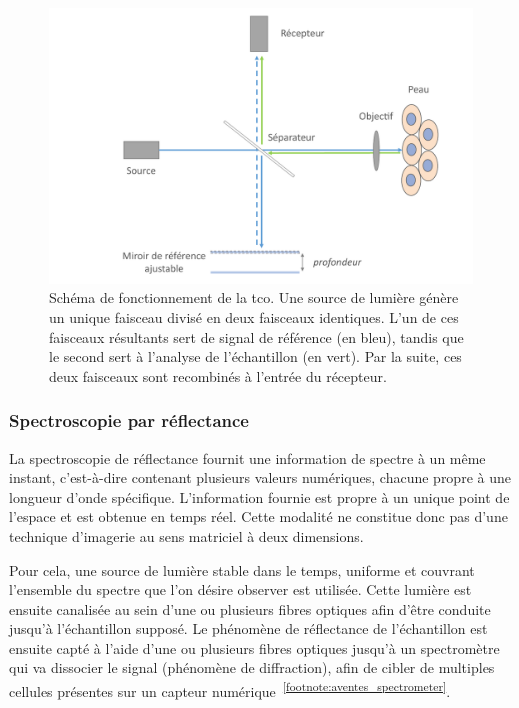 \begin{figure}[H]
    \centering
    \includegraphics[width=1\linewidth]{contents/chapter_2/resources/scheme_principle_oct.pdf}
    \caption{Schéma de fonctionnement de la \gls{tco}. Une source de lumière génère un unique faisceau divisé en deux faisceaux identiques. L'un de ces faisceaux résultants sert de signal de référence (en bleu), tandis que le second sert à l'analyse de l'échantillon (en vert). Par la suite, ces deux faisceaux sont recombinés à l'entrée du récepteur.}
    \label{fig:scheme_principle_oct}
\end{figure}\par
\clearpage

\subsubsection{Spectroscopie par réflectance}
La spectroscopie de réflectance fournit une information de spectre à un même instant, c’est-à-dire contenant plusieurs valeurs numériques, chacune propre à une longueur d'onde spécifique. L'information fournie est propre à un unique point de l'espace et est obtenue en temps réel. Cette modalité ne constitue donc pas d'une technique d'imagerie au sens matriciel à deux dimensions.\par

Pour cela, une source de lumière stable dans le temps, uniforme et couvrant l'ensemble du spectre que l'on désire observer est utilisée. Cette lumière est ensuite canalisée au sein d'une ou plusieurs fibres optiques afin d'être conduite jusqu'à l'échantillon supposé. Le phénomène de réflectance de l'échantillon est ensuite capté à l'aide d'une ou plusieurs fibres optiques jusqu'à un spectromètre qui va dissocier le signal (phénomène de diffraction), afin de cibler de multiples cellules présentes sur un capteur numérique~\cite{Murphy2005,Malla2008}\textsuperscript{\ref{footnote:aventes_spectrometer}}.\par

